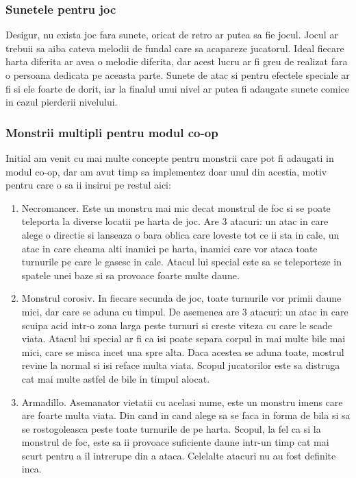 \documentclass[12pt, a4paper]{article}
\begin{document}
	
	
	
	\subsubsection{Sunetele pentru joc}
	
	Desigur, nu exista joc fara sunete, oricat de retro ar putea sa fie jocul. Jocul ar trebuii sa aiba cateva melodii de fundal care sa acapareze jucatorul. Ideal fiecare harta diferita ar avea o melodie diferita, dar acest lucru ar fi greu de realizat fara o persoana dedicata pe aceasta parte. Sunete de atac si pentru efectele speciale ar fi si ele foarte de dorit, iar la finalul unui nivel ar putea fi adaugate sunete comice in cazul pierderii nivelului.
	
	
	
	
	
	\subsubsection{Monstrii multipli pentru modul co-op}
	
	Initial am venit cu mai multe concepte pentru monstrii care pot fi adaugati in modul co-op, dar am avut timp sa implementez doar unul din acestia, motiv pentru care o sa ii insirui pe restul aici:
	
	\begin{enumerate}
		\item Necromancer. Este un monstru mai mic decat monstrul de foc si se poate teleporta la diverse locatii pe harta de joc. Are 3 atacuri: un atac in care alege o directie si lanseaza o bara oblica care loveste tot ce ii sta in cale, un atac in care cheama alti inamici pe harta, inamici care vor ataca toate turnurile pe care le gasesc in cale. Atacul lui special este sa se teleporteze in spatele unei baze si sa provoace foarte multe daune.
		\item Monstrul corosiv. In fiecare secunda de joc, toate turnurile vor primii daune mici, dar care se aduna cu timpul. De asemenea are 3 atacuri: un atac in care scuipa acid intr-o zona larga peste turnuri si creste viteza cu care le scade viata. Atacul lui special ar fi ca isi poate separa corpul in mai multe bile mai mici, care se misca incet una spre alta. Daca acestea se aduna toate, mostrul revine la normal si isi reface multa viata. Scopul jucatorilor este sa distruga cat mai multe astfel de bile in timpul alocat.
		\item Armadillo. Asemanator vietatii cu acelasi nume, este un monstru imens care are foarte multa viata. Din cand in cand alege sa se faca in forma de bila si sa se rostogoleasca peste toate turnurile de pe harta. Scopul, la fel ca si la monstrul de foc, este sa ii provoace suficiente daune intr-un timp cat mai scurt pentru a il intrerupe din a ataca. Celelalte atacuri nu au fost definite inca.
	\end{enumerate}
	
\end{document}

